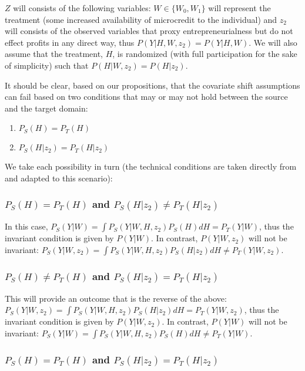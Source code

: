\documentclass[a4paper,12pt]{article}
\begin{document}
$Z$ will consists of the following variables: $W \in \{ W_0, W_1\}$ will represent the treatment (some increased availability of microcredit to the individual) and $z_2$ will consists of the observed variables that proxy entrepreneurialness but do not effect profits in any direct way, thus $P(Y|H,W,z_2) = P(Y|H,W)$. We will also assume that the treatment, $H$, is randomized (with full participation for the sake of simplicity) such that $P(H|W,z_2) = P(H|z_2)$.

It should be clear, based on our propositions, that the covariate shift assumptions can fail based on two conditions that may or may not hold between the source and the target domain: 

\begin{enumerate}
\item $P_S(H) = P_T(H)$
\item $P_S(H|z_2) = P_T(H|z_2)$
\end{enumerate}

We take each possibility in turn (the technical conditions are taken directly from \cite{Pearl2014} and adapted to this scenario):

\subsubsection*{$P_S(H) = P_T(H)$ and $P_S(H|z_2) \neq P_T(H|z_2)$} 

In this case, $P_S(Y|W) = \int P_S(Y|W,H,z_2)P_S(H) dH = P_T(Y|W)$, thus the invariant condition is given by $P(Y|W)$. In contrast, $P(Y|W,z_2)$ will not be invariant: $P_S(Y|W,z_2) = \int P_S(Y|W,H,z_2)P_S(H|z_2) dH \neq P_T(Y|W,z_2)$.

\subsubsection*{$P_S(H) \neq P_T(H)$ and $P_S(H|z_2) = P_T(H|z_2)$}

This will provide an outcome that is the reverse of the above: $P_S(Y|W,z_2) = \int P_S(Y|W,H,z_2)P_S(H|z_2) dH = P_T(Y|W,z_2)$, thus the invariant condition is given by $P(Y|W,z_2)$. In contrast, $P(Y|W)$ will not be invariant: $P_S(Y|W) = \int P_S(Y|W,H,z_2)P_S(H) dH \neq P_T(Y|W)$.

\subsubsection*{$P_S(H) = P_T(H)$ and $P_S(H|z_2) = P_T(H|z_2)$} 
\end{document}
